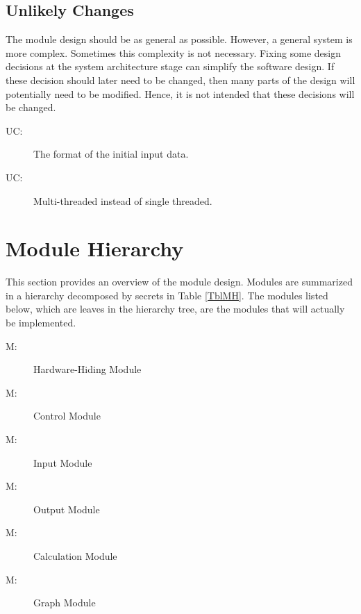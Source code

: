 \documentclass[12pt, titlepage]{article}
\newcounter{ucnum}
\newcommand{\uctheucnum}{UC\theucnum}
\newcounter{mnum}
\newcommand{\mthemnum}{M\themnum}
\begin{document}
\subsection{Unlikely Changes} \label{SecUchange}

The module design should be as general as possible. However, a general system is
more complex. Sometimes this complexity is not necessary. Fixing some design
decisions at the system architecture stage can simplify the software design. If
these decision should later need to be changed, then many parts of the design
will potentially need to be modified. Hence, it is not intended that these
decisions will be changed.

\begin{description}
\item[ \uctheucnum \label{ucIO}:] The format of the
  initial input data.
  \item[ \uctheucnum \label{ucIO}:] Multi-threaded instead of single threaded.
\end{description}

\newpage

\section{Module Hierarchy} \label{SecMH}

This section provides an overview of the module design. Modules are summarized
in a hierarchy decomposed by secrets in Table \ref{TblMH}. The modules listed
below, which are leaves in the hierarchy tree, are the modules that will
actually be implemented.

\begin{description}
\item [ \mthemnum \label{M_HH}:] Hardware-Hiding Module
\item [ \mthemnum \label{M_CO}:] Control Module
\item [ \mthemnum \label{M_I}:] Input Module
\item [ \mthemnum \label{M_O}:] Output Module
\item [ \mthemnum \label{M_CA}:] Calculation Module
\item [ \mthemnum \label{M_G}:] Graph Module
\end{description}
\end{document}

